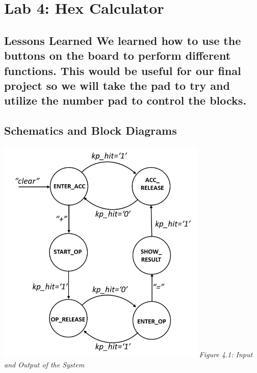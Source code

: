 \chapter{Lab 4: Hex Calculator \\
\label{Introduction}}


\section{Lessons Learned
    We learned how to use the buttons on the board to perform different functions. This would be useful for our final project so we will take the pad to try and utilize the number pad to control the blocks. 
\label{Section::Lessons Learned}}
 \section{Schematics and Block Diagrams}
    \includegraphics[width=100mm]{lab4/hexcalc.png}
    \emph{Figure 4.1: Input and Output of the System}
    
